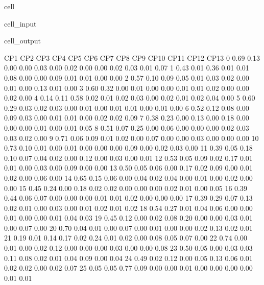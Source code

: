 \documentclass[letterpaper,10pt,french]{sphinxmanual}
\begin{document}
\begin{sphinxuseclass}{cell}
\begin{sphinxuseclass}{cell_input}
\end{sphinxuseclass}
\begin{sphinxuseclass}{cell_output}
\begin{sphinxVerbatim}[commandchars=\\\{\}]
            	CP1	CP2	CP3	CP4	CP5	CP6	CP7	CP8	CP9	CP10	CP11	CP12	CP13 
         0	0.69 	0.13 	0.00 	0.00 	0.03 	0.00 	0.02 	0.00 	0.00 	0.02 	0.03 	0.01 	0.07
         1	0.43 	0.01 	0.36 	0.01 	0.01 	0.08 	0.00 	0.00 	0.09 	0.01 	0.01 	0.00 	0.00
         2	0.57 	0.10 	0.09 	0.05 	0.01 	0.03 	0.02 	0.00 	0.01 	0.00 	0.13 	0.01 	0.00
         3	0.60 	0.32 	0.00 	0.01 	0.00 	0.00 	0.01 	0.01 	0.02 	0.00 	0.00 	0.02 	0.00
         4	0.14 	0.11 	0.58 	0.02 	0.01 	0.02 	0.03 	0.00 	0.02 	0.01 	0.02 	0.04 	0.00
         5	0.60 	0.29 	0.03 	0.02 	0.03 	0.00 	0.01 	0.00 	0.01 	0.01 	0.00 	0.01 	0.00
         6	0.52 	0.12 	0.08 	0.00 	0.09 	0.03 	0.00 	0.01 	0.01 	0.00 	0.02 	0.02 	0.09
         7	0.38 	0.23 	0.00 	0.13 	0.00 	0.18 	0.00 	0.00 	0.00 	0.01 	0.00 	0.01 	0.05
         8	0.51 	0.07 	0.25 	0.00 	0.06 	0.00 	0.00 	0.00 	0.02 	0.03 	0.03 	0.02 	0.00
         9	0.71 	0.06 	0.09 	0.01 	0.02 	0.00 	0.07 	0.00 	0.00 	0.03 	0.00 	0.00 	0.00
        10	0.73 	0.10 	0.01 	0.00 	0.01 	0.00 	0.00 	0.00 	0.09 	0.00 	0.02 	0.03 	0.00
        11	0.39 	0.05 	0.18 	0.10 	0.07 	0.04 	0.02 	0.00 	0.12 	0.00 	0.03 	0.00 	0.01
        12	0.53 	0.05 	0.09 	0.02 	0.17 	0.01 	0.01 	0.00 	0.03 	0.00 	0.09 	0.00 	0.00
        13	0.50 	0.05 	0.06 	0.00 	0.17 	0.02 	0.09 	0.00 	0.01 	0.02 	0.00 	0.06 	0.00
        14	0.65 	0.15 	0.06 	0.00 	0.04 	0.02 	0.04 	0.00 	0.01 	0.00 	0.02 	0.00 	0.00
        15	0.45 	0.24 	0.00 	0.18 	0.02 	0.02 	0.00 	0.00 	0.00 	0.02 	0.01 	0.00 	0.05
        16	0.39 	0.44 	0.06 	0.07 	0.00 	0.00 	0.00 	0.01 	0.01 	0.02 	0.00 	0.00 	0.00
        17	0.39 	0.29 	0.07 	0.13 	0.02 	0.01 	0.00 	0.03 	0.00 	0.01 	0.02 	0.01 	0.02
        18	0.54 	0.27 	0.01 	0.04 	0.06 	0.00 	0.00 	0.01 	0.00 	0.00 	0.01 	0.04 	0.03
        19	0.45 	0.12 	0.00 	0.02 	0.08 	0.20 	0.00 	0.00 	0.03 	0.01 	0.00 	0.07 	0.00
        20	0.70 	0.04 	0.01 	0.00 	0.07 	0.00 	0.01 	0.00 	0.00 	0.02 	0.13 	0.02 	0.01
        21	0.19 	0.01 	0.14 	0.17 	0.02 	0.24 	0.01 	0.02 	0.00 	0.08 	0.05 	0.07 	0.00
        22	0.74 	0.00 	0.01 	0.00 	0.02 	0.12 	0.00 	0.00 	0.00 	0.03 	0.00 	0.00 	0.08
        23	0.50 	0.05 	0.00 	0.03 	0.03 	0.11 	0.08 	0.02 	0.01 	0.04 	0.09 	0.00 	0.04
        24	0.49 	0.02 	0.12 	0.00 	0.05 	0.13 	0.06 	0.01 	0.02 	0.02 	0.00 	0.02 	0.07
        25	0.05 	0.05 	0.77 	0.09 	0.00 	0.00 	0.01 	0.00 	0.00 	0.00 	0.00 	0.01 	0.01

\end{sphinxVerbatim}
\end{sphinxuseclass}
\end{sphinxuseclass}
\end{document}
